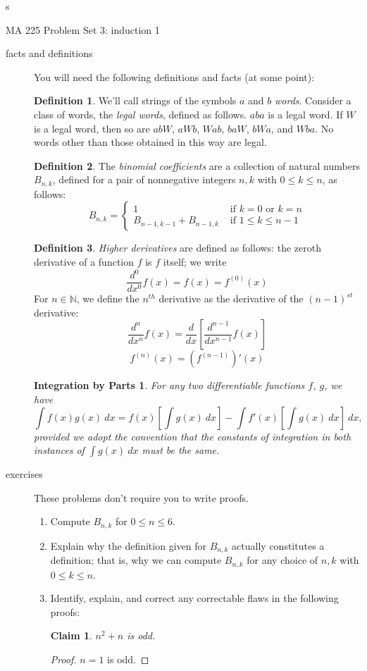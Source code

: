 s\documentclass[11pt]{letter}
\newtheorem*{IBP}{Integration by Parts}
\newtheorem{claim}{Claim}
\theoremstyle{definition}
\newtheorem{defn}{Definition}
\begin{document}
\pagestyle{empty}

{\Large MA 225 Problem Set 3: induction 1}\\

\begin{description}
	\item[facts and definitions] You will need the following definitions and facts (at some point):
			\begin{defn}
				We'll call strings of the symbols $a$ and $b$ {\em words}. Consider a class of words, the {\em legal words}, defined as follows. $aba$ is a legal word. If $W$ is a legal word, then so are $abW$, $aWb$, $Wab$, $baW$, $bWa$, and $Wba$. No words other than those obtained in this way are legal.
			\end{defn}
			\begin{defn}
				The {\em binomial coefficients} are a collection of natural numbers $B_{n,k}$, defined for a pair of nonnegative integers $n,k$ with  $0\leq k\leq n$, as follows:
				$$B_{n,k}=\begin{cases}1 & \text{ if } k=0\text{ or }k=n\\B_{n-1,k-1}+B_{n-1,k} & \text{ if }1\leq k\leq n-1\end{cases}$$
			\end{defn}
			
			\begin{defn}
				{\em Higher derivatives} are defined as follows: the zeroth derivative of a function $f$ is $f$ itself; we write
					$$\frac{d^0}{dx^0}f(x)=f(x)=f^{(0)}(x)$$
				For $n\in \mathbb{N}$, we define the $n^{th}$ derivative as the derivative of the $(n-1)^{st}$ derivative:
					$$\frac{d^n}{dx^n}f(x)=\frac{d}{dx}\left[\frac{d^{n-1}}{dx^{n-1}} f(x)\right]$$
					$$f^{(n)}(x)=\left(f^{(n-1)}\right)'(x)$$
			\end{defn}
			
			\begin{IBP}
				For any two differentiable functions $f$, $g$, we have
				 $$\int f(x)g(x)\ dx = f(x)\left[\int g(x)\ dx\right]-\int f'(x)\left[\int g(x)\ dx\right]\ dx,$$ provided we adopt the convention that the constants of integration in both instances of $\int g(x)\ dx$ must be the same.
			\end{IBP}

	\item[exercises]  These problems don't require you to write proofs.
		\begin{enumerate}
			\item Compute $B_{n,k}$ for $0\leq n\leq 6$.
			\item Explain why the definition given for $B_{n,k}$ actually constitutes a definition; that is, why we can compute $B_{n,k}$ for any choice of $n,k$ with $0\leq k\leq n$.
			\item Identify, explain, and correct any correctable flaws in the following proofs:
				\begin{claim}
					$n^2+n$ is odd.
				\end{claim}
				\begin{proof}
					$n=1$ is odd.
					

\end{proof}
\end{enumerate}
\end{description}
\end{document}
